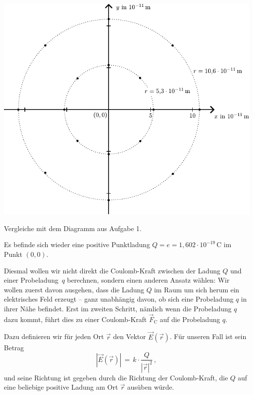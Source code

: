 \documentclass[task=1]{exercise}
\renewcommand{\vec}{\overrightarrow}
\begin{document}
  \vspace{2cm}
  
  \begin{center}
   \includegraphics{images/diagram.pdf}
  \end{center}
  
  \vspace{2cm}
  
  Vergleiche mit dem Diagramm aus Aufgabe 1.
  
\newpage

    
    Es befinde sich wieder eine positive Punktladung $Q = e = 1,602 \cdot 10^{-19}\,\mathrm{C}$ im Punkt $(0,0)$.
    
    Diesmal wollen wir nicht direkt die Coulomb-Kraft zwischen der Ladung $Q$ und einer \glqq Probeladung\grqq~$q$ berechnen, sondern einen anderen Ansatz w\"ahlen:
    Wir wollen zuerst davon ausgehen, dass die Ladung $Q$ im Raum um sich herum ein elektrisches Feld erzeugt -- ganz unabh\"angig davon, ob sich eine Probeladung $q$ in ihrer N\"ahe befindet. Erst im zweiten Schritt, n\"amlich wenn die Probeladung $q$ dazu kommt, f\"uhrt dies zu einer Coulomb-Kraft $\vec{F}_\mathrm{C}$ auf die Probeladung $q$.
    
    Dazu definieren wir f\"ur jeden Ort $\vec{r}$ den Vektor $\vec{E}(\vec{r})$.
    F\"ur unseren Fall ist sein Betrag
    \begin{equation}
        \left| \vec{E}(\vec{r}) \right| \,=\, k\cdot \frac{Q}{\left| \vec{r} \right|^2}\, ,
    \end{equation}
    und seine Richtung ist gegeben durch die Richtung der Coulomb-Kraft, die $Q$ auf eine beliebige positive Ladung am Ort $\vec{r}$ aus\"uben w\"urde.
    
\end{document}

